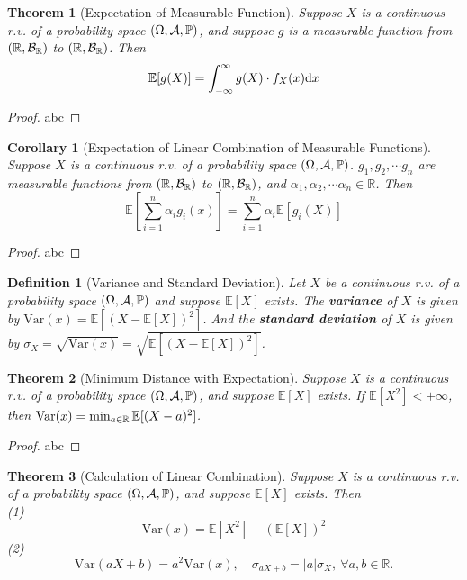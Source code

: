 \documentclass[openany,12pt]{book}
\newtheorem{theorem}{Theorem}[chapter]
\newtheorem{corollary}{Corollary}[chapter]
\newtheorem{definition}{Definition}[chapter]
\begin{document}
\begin{theorem}[Expectation of Measurable Function]
Suppose $X$ is a continuous r.v. of a probability space $(\Omega,\mathcal{A},\mathbb{P})$, and suppose $g$ is a measurable function from $(\mathbb{R},\mathcal{B}_\mathbb{R})$ to $(\mathbb{R},\mathcal{B}_\mathbb{R})$.
Then
\[\mathbb{E}[ g(X)] = \int_{- \infty}^{\infty}{g(X)} \cdot f_{X}(x)\mathrm{d} x\]
\end{theorem}

\begin{proof}
  abc
\end{proof}

\begin{corollary}[Expectation of Linear Combination of Measurable Functions]
Suppose $X$ is a continuous r.v. of a probability space $(\Omega,\mathcal{A},\mathbb{P})$. $g_1,g_2,\cdots g_n$ are measurable functions from $(\mathbb{R},\mathcal{B}_\mathbb{R})$ to $(\mathbb{R},\mathcal{B}_\mathbb{R})$, and $\alpha_1,\alpha_2,\cdots\alpha_n\in\mathbb{R}$. Then
\[\mathbb{E}\left[ \sum_{i = 1}^{n}\alpha_{i}g_{i}(x) \right] = \sum_{i = 1}^{n}\alpha_{i}\mathbb{E}[ g_{i}(X)]\]
\end{corollary}

\begin{proof}
  abc
\end{proof}

\begin{definition}[Variance and Standard Deviation]
Let $X$ be a continuous r.v. of a probability space $(\Omega,\mathcal{A},\mathbb{P})$ and suppose $\mathbb{E}[ X]$ exists. The \textbf{variance} of $X$ is given by $\mathrm{Var}(x) = \mathbb{E}[(X - \mathbb{E}[ X])^{2}]$. And the \textbf{standard deviation} of $X$ is given by
$\sigma_{X} = \sqrt{\mathrm{Var}(x)} = \sqrt{\mathbb{E}[(X - \mathbb{E}[ X])^{2}]}$.
\end{definition}

\begin{theorem}[Minimum Distance with Expectation]
Suppose $X$ is a continuous r.v. of a probability space $(\Omega,\mathcal{A},\mathbb{P})$, and suppose $\mathbb{E}[X]$ exists. If $\mathbb{E}\left[X^2\right]<+\infty$, then $\mathrm{Var}(x)=\min_{a\in\mathbb{R}}\mathbb{E}[(X-a)^2]$.
\end{theorem}

\begin{proof}
  abc
\end{proof}

\begin{theorem}[Calculation of Linear Combination]
Suppose $X$ is a continuous r.v. of a probability space $(\Omega,\mathcal{A},\mathbb{P})$, and suppose $\mathbb{E}[X]$ exists. Then\\
(1)
$$
\mathrm{Var}(x)=\mathbb{E}\left[X^2\right]-(\mathbb{E}[X])^2
$$
(2)
$$
\mathrm{Var}(aX+b)=a^2\mathrm{Var}(x),\quad
\sigma_{aX+b}=\left|a\right|\sigma_X,\ \forall a,b\in\mathbb{R}.
$$
\end{theorem}
\end{document}
